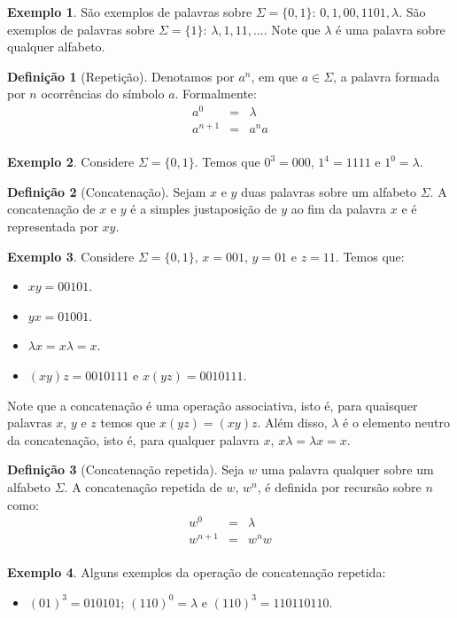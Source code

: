 \documentclass[a4paper]{article}
\theoremstyle{definition}
\newtheorem{Example}{Exemplo}
\newtheorem{Definition}{Definição}
\begin{document}
  \begin{Example}
    São exemplos de palavras sobre $\Sigma=\{0,1\}$: $0,1,00,1101,\lambda$.
    São exemplos de palavras sobre $\Sigma =\{1\}$: $\lambda,1,11,...$.
    Note que $\lambda$ é uma palavra sobre qualquer alfabeto.
  \end{Example}

  \begin{Definition}[Repetição]
    Denotamos por $a^n$, em que $a \in \Sigma$, a palavra formada por
    $n$ ocorrências do símbolo $a$. Formalmente:
    \[
      \begin{array}{lcl}
        a^0      & = & \lambda \\
        a^{n + 1} & = & a^n a\\
      \end{array}
    \]
  \end{Definition}

  \begin{Example}
    Considere $\Sigma = \{0,1\}$. Temos que $0^3 = 000$, $1^4 = 1111$ e $1^0 = \lambda$.
  \end{Example}

  \begin{Definition}[Concatenação]
    Sejam $x$ e $y$ duas palavras sobre um alfabeto $\Sigma$. A concatenação de
    $x$ e $y$ é a simples justaposição de $y$ ao fim da palavra $x$ e é
    representada por $xy$.
  \end{Definition}
  \begin{Example}
    Considere $\Sigma = \{0,1\}$, $x = 001$, $y = 01$ e $z = 11$. Temos que:
    \begin{itemize}
      \item $xy = 00101$.
      \item $yx = 01001$.
      \item $\lambda x = x \lambda = x$.
      \item $(xy)z = 0010111$ e $x(yz) = 0010111$.
    \end{itemize}
    Note que a concatenação é uma operação associativa, isto é, para quaisquer
    palavras $x$, $y$ e $z$ temos que $x(yz) = (xy)z$. Além disso, $\lambda$ é
    o elemento neutro da concatenação, isto é, para qualquer palavra $x$,
    $x\lambda = \lambda x = x$.
  \end{Example}
  \begin{Definition}[Concatenação repetida]
    Seja $w$ uma palavra qualquer sobre um alfabeto $\Sigma$. A concatenação
    repetida de $w$, $w^n$, é definida por recursão sobre $n$ como:
    \[
      \begin{array}{lcl}
        w^0 & = & \lambda\\
        w^{n + 1} & = & w^nw\\
      \end{array}
    \]
  \end{Definition}
  \begin{Example}
    Alguns exemplos da operação de concatenação repetida:
    \begin{itemize}
      \item $(01)^3 = 010101$; $(110)^0 = \lambda$ e $(110)^3 = 110110110$.
    \end{itemize}
  \end{Example}
\end{document}
